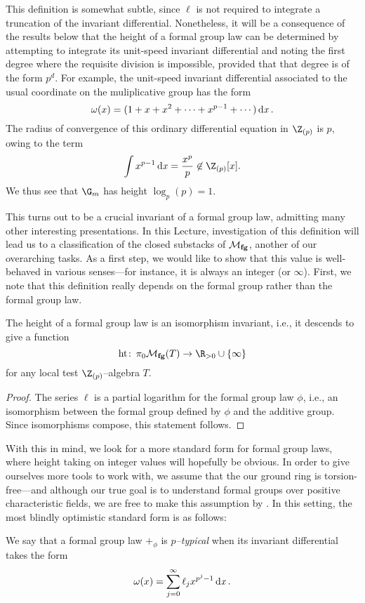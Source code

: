 \begin{example}\label{HeightOfGmExample}
This definition is somewhat subtle, since \(\ell\) is not required to integrate a truncation of the invariant differential.  Nonetheless, it will be a consequence of the results below that the height of a formal group law can be determined by attempting to integrate its unit-speed invariant differential and noting the first degree where the requisite division is impossible, provided that that degree is of the form \(p^d\).  For example, the unit-speed invariant differential associated to the usual coordinate on the muliplicative group has the form \[\omega(x) = (1 + x + x^2 + \cdots + x^{p-1} + \cdots) \operatorname{d\mathit{x}}.\]  The radius of convergence of this ordinary differential equation in \(\Z_{(p)}\) is \(p\), owing to the term \[\int x^{p-1} \dx = \frac{x^p}{p} \not\in \Z_{(p)}[x].\]  We thus see that \(\G_m\) has height \(\log_p(p) = 1\).
\end{example}

This turns out to be a crucial invariant of a formal group law, admitting many other interesting presentations.  In this Lecture, investigation of this definition will lead us to a classification of the closed substacks of \(\mathcal{M}_{\mathbf{fg}}\), another of our overarching tasks.  As a first step, we would like to show that this value is well-behaved in various senses---for instance, it is always an integer (or \(\infty\)).  First, we note that this definition really depends on the formal group rather than the formal group law.

\begin{lemma}\label{HeightIsAnIsomInvariant}
The height of a formal group law is an isomorphism invariant, i.e., it descends to give a function \[\height\co \pi_0 \moduli{fg}(T) \to \R_{> 0} \cup \{\infty\}\] for any local test \(\Z_{(p)}\)--algebra \(T\).
\end{lemma}
\begin{proof}
The series \(\ell\) is a partial logarithm for the formal group law \(\phi\), i.e., an isomorphism between the formal group defined by \(\phi\) and the additive group.  Since isomorphisms compose, this statement follows.
\end{proof}

With this in mind, we look for a more standard form for formal group laws, where height taking on integer values will hopefully be obvious.  In order to give ourselves more tools to work with, we assume that the our ground ring is torsion-free---and although our true goal is to understand formal groups over positive characteristic fields, we are free to make this assumption by .  In this setting, the most blindly optimistic standard form is as follows:
\begin{definition}\label{DefnPTypInvDiffl}
We say that a formal group law \(+_\phi\) is \textit{\(p\)--typical} when its invariant differential takes the form \[\omega(x) = \sum_{j=0}^\infty \ell_j x^{p^j-1} \operatorname{d\mathit{x}}.\]
\end{definition}

